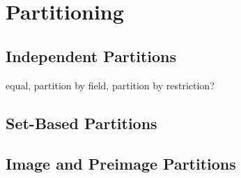 \chapter{Partitioning}
\label{chap:partitioning}

\section{Independent Partitions}
\label{sec:equal}
equal, partition by field, partition by restriction?
\section{Set-Based Partitions}
\label{sec:set}

\section{Image and Preimage Partitions}
\label{sec:image}



